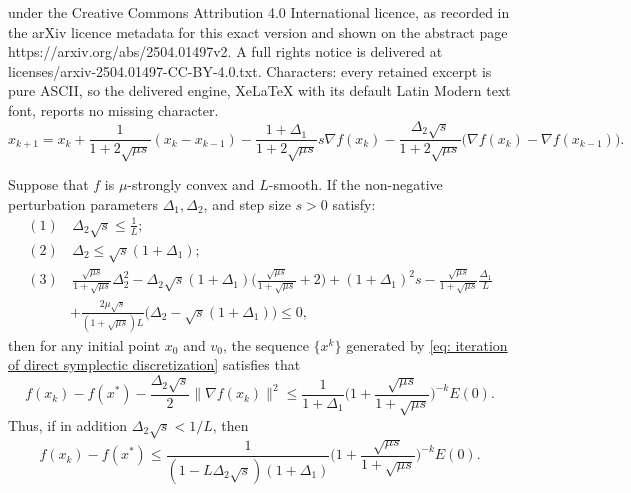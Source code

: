 \documentclass[10pt,a4paper]{amsart}
\begin{document}
under the Creative Commons Attribution 4.0 International licence, as recorded in the arXiv licence metadata for this exact version and shown on the abstract page https://arxiv.org/abs/2504.01497v2. A full rights notice is delivered at licenses/arxiv-2504.01497-CC-BY-4.0.txt. Characters: every retained excerpt is pure ASCII, so the delivered engine, XeLaTeX with its default Latin Modern text font, reports no missing character.
\begin{equation}
    \label{eq: iteration of direct symplectic discretization}
    x_{k+1}=x_k+\frac{1}{1+2\sqrt{\mu s}}(x_k-x_{k-1})-\frac{1+\Delta_1}{1+2\sqrt{\mu s}}s\nabla f(x_k)-\frac{\Delta_2\sqrt{s}}{1+2\sqrt{\mu s}}\big(\nabla f(x_k)-\nabla f(x_{k-1})\big).
\end{equation}

\begin{THM}
    \label{th:symplectic 2}
    Suppose that $f$ is $\mu$-strongly convex and $L$-smooth.  
    If the non-negative perturbation parameters $\Delta_1, \Delta_2$, and step size $s>0$ satisfy:
\begin{equation}
    \label{conditions of direct symplectic 2}
    \begin{aligned}
        (1)& \, \Delta_2\sqrt{s}\leqslant \frac{1}{L};\\
        (2)& \, \Delta_2\leqslant \sqrt{s}(1+\Delta_1);\\
        (3)& \, \frac{\sqrt{\mu s}}{1+\sqrt{\mu s}}\Delta_2^2-\Delta_2\sqrt{s}(1+\Delta_1)\Big(\frac{\sqrt{\mu s}}{1+\sqrt{\mu s}}+2\Big)+(1+\Delta_1)^2s
        -\frac{\sqrt{\mu s}}{1+\sqrt{\mu s}}\frac{\Delta_1}{L}\\
        &+\frac{2\mu\sqrt{s}}{(1+\sqrt{\mu s})L}\big(\Delta_2-\sqrt{s}(1+\Delta_1)\big)\leqslant 0,
    \end{aligned}
\end{equation}
then for any initial point $x_0$ and $v_0$, the sequence $\{x^k\}$ generated by \eqref{eq: iteration of direct symplectic discretization} satisfies that 
\begin{equation*}
    f(x_k)-f(x^*)-\frac{\Delta_2\sqrt{s}}{2}\|\nabla f(x_k)\|^2 \leqslant \frac{1}{1+\Delta_1}\Big(1+\frac{\sqrt{\mu s}}{1+\sqrt{\mu s}}\Big)^{-k}E(0).
\end{equation*}
Thus, if in addition $\Delta_2\sqrt{s}< 1/L$, then
\begin{equation}\label{eq:f_rate_symplectic}
    f(x_k)-f(x^*)\leqslant \frac{1}{(1-L\Delta_2\sqrt{s})(1+\Delta_1)}\Big(1+\frac{\sqrt{\mu s}}{1+\sqrt{\mu s}}\Big)^{-k}E(0).
\end{equation}
\end{THM}
\end{document}
